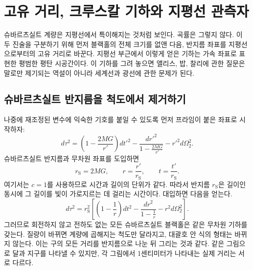 \chapter{고유 거리, 크루스칼 기하와 지평선 관측자}

슈바르츠실트 계량은 지평선에서 특이해지는 것처럼 보인다. 곡률은 그렇지 않다. 이 두 진술을 구분하기 위해 먼저 블랙홀의 전체 크기를 없앤 다음, 반지름 좌표를 지평선으로부터의 고유 거리로 바꾼다. 지평선 부근에서 이렇게 얻은 기하는 가속 좌표로 표현한 평범한 평탄 시공간이다. 이 기하를 그려 놓으면 앨리스, 밥, 찰리에 관한 질문은 말로만 제기되는 역설이 아니라 세계선과 광선에 관한 문제가 된다.

\section{슈바르츠실트 반지름을 척도에서 제거하기}

나중에 재조정된 변수에 익숙한 기호를 붙일 수 있도록 먼저 프라임이 붙은 좌표로 시작하자:
\begin{equation}
d\tau^2
=
\left(1-\frac{2MG}{r'}\right)dt'^2
-
\frac{dr'^2}{1-\frac{2MG}{r'}}
-
r'^2d\Omega_2^2.
\label{eq:l7-schwarzschild-dimensional}
\end{equation}
슈바르츠실트 반지름과 무차원 좌표를 도입하면
\begin{equation}
r_{\mathrm S}=2MG,
\qquad
r=\frac{r'}{r_{\mathrm S}},
\qquad
t=\frac{t'}{r_{\mathrm S}}.
\label{eq:l7-rescaling}
\end{equation}
여기서는 \(c=1\)를 사용하므로 시간과 길이의 단위가 같다. 따라서 반지름 \(r_{\mathrm S}\)은 길이인 동시에 그 길이를 빛이 가로지르는 데 걸리는 시간이다. 대입하면 다음을 얻는다.
\begin{equation}
d\tau^2
=r_{\mathrm S}^2
\left[
\left(1-\frac1r\right)dt^2
-
\frac{dr^2}{1-\frac1r}
-
r^2d\Omega_2^2
\right].
\label{eq:l7-schwarzschild-rescaled}
\end{equation}
그러므로 회전하지 않고 전하도 없는 모든 슈바르츠실트 블랙홀은 같은 무차원 기하를 갖는다. 질량이 바뀌면 계량에 곱해지는 척도만 달라지고, 대괄호 안 식의 형태는 바뀌지 않는다. 이는 구의 모든 거리를 반지름으로 나눈 뒤 그리는 것과 같다. 같은 그림으로 달과 지구를 나타낼 수 있지만, 각 그림에서 1센티미터가 나타내는 실제 거리는 서로 다르다.

\begin{classroomqa}
\end{classroomqa}

